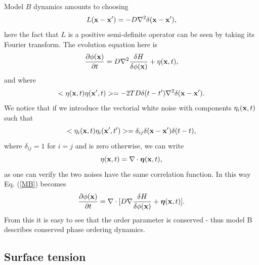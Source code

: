 Model $B$ dynamics amounts to choosing
\begin{equation}
    L({\bf x}-{\bf x}')= -D\nabla^2 \delta({\bf x}-{\bf x'}),
\end{equation}
here the fact that $L$ is a positive semi-definite operator can be seen by taking its Fourier transform. The evolution equation here is
\begin{equation}
    \frac{\partial \phi({\bf x})}{\partial t}= D\nabla^2 \frac{\delta H}{\delta \phi({\bf x})} + \eta({\bf x},t),
    \label{MB}
\end{equation}
and where
\begin{equation}
    < \eta({\bf x},t)\eta({\bf x}',t)> =-2TD   \delta(t-t')\nabla^2\delta({\bf x}-{\bf x'}).
\end{equation}
We notice that if we introduce the vectorial white noise with components $\eta_i({\bf x},t)$ such that
\begin{equation}
    < \eta_i({\bf x},t) \eta_i({\bf x}',t')> =\delta_{ij} \delta({\bf x}-{\bf x'})\delta(t-t),
\end{equation}
where $\delta_{ij}=1$ for $i=j$ and is zero otherwise,  we can write
\begin{equation}
    \eta({\bf x},t)= \nabla\cdot {\boldsymbol \eta}({\bf x},t),
\end{equation}
as one can verify the two noises have the same correlation function. In this way Eq. (\ref{MB}) becomes 
\begin{equation}
    \frac{\partial \phi({\bf x})}{\partial t}= \nabla\cdot[ D\nabla \frac{\delta H}{\delta \phi({\bf x})} +         {\boldsymbol\eta}({\bf x},t)].
\end{equation}
From this it is easy to see that the order parameter is conserved - thus model  B describes conserved phase ordering dynamics.


    \subsection{Surface tension}

